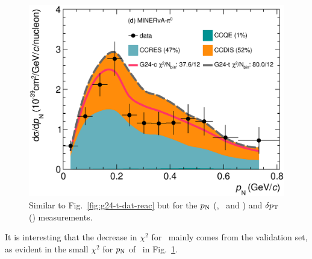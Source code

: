 \begin{figure}
        \includegraphics[width=\dbfigwid\textwidth]{figures/tuning/0013-min_pi0_pn_reac_decomp.eps}
        \caption{\label{fig:g24-t-pn-reac}  
        Similar to Fig.~\ref{fig:g24-t-dat-reac} but for the $p_\textrm{N}$ (\ttkpip, \minzpi\ and \minpiz) and $\delta p_\textrm{T}$ (\ttkzpi) measurements. 
        } 
    \end{figure}
    It is interesting that the decrease in $\chi^2$ for \gT\ mainly comes from the validation set, as evident in the small $\chi^2$ for $p_\textrm{N}$ of \minzpi\ in Fig.~\ref{fig:g24-t-pn-reac}.

